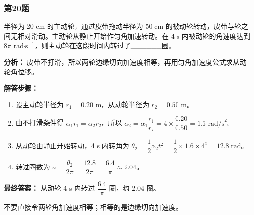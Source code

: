 \documentclass[12pt,a4paper]{ctexart}
\begin{document}
\subsubsection*{第20题}
\begin{tcolorbox}[colback=gray!2!white,colframe=black!60,title={题目}]
半径为 20 cm 的主动轮，通过皮带拖动半径为 50 cm 的被动轮转动，皮带与轮之间无相对滑动。主动轮从静止开始作匀角加速转动。在 4 s 内被动轮的角速度达到 \(8\pi\text{ rad·s}^{-1}\)，则主动轮在这段时间内转过了\_\_\_\_\_\_圈。\par
\end{tcolorbox}
\begin{tcolorbox}[colback=blue!2!white,colframe=blue!55!black,title={完整答案}]
\textbf{分析：}
皮带不打滑，所以两轮边缘切向加速度相等，再用匀角加速度公式求从动轮角位移。\par
\textbf{解答步骤：}
\begin{enumerate}
\item 设主动轮半径为 \(r_1=0.20\text{ m}\)，从动轮半径为 \(r_2=0.50\text{ m}\)。
\item 由不打滑条件得 \(\alpha_1r_1=\alpha_2r_2\)，所以 \(\alpha_2=\alpha_1\dfrac{r_1}{r_2}=4\times \dfrac{0.20}{0.50}=1.6\text{ rad/s}^2\)。
\item 从动轮由静止开始转动，4 s 内转角为 \(\theta_2=\dfrac12 \alpha_2 t^2=\dfrac12\times 1.6\times 4^2=12.8\text{ rad}\)。
\item 转过圈数为 \(n=\dfrac{\theta_2}{2\pi}=\dfrac{12.8}{2\pi}=\dfrac{6.4}{\pi}\approx 2.04\)。
\end{enumerate}
\textbf{最终答案：}
从动轮 4 s 内转过 \(\dfrac{6.4}{\pi}\) 圈，约 \(2.04\) 圈。\par
\end{tcolorbox}
\begin{tcolorbox}[colback=red!2!white,colframe=red!55!black,title={易错点}]
不要直接令两轮角加速度相等；相等的是边缘切向加速度。\par
\end{tcolorbox}
\end{document}
